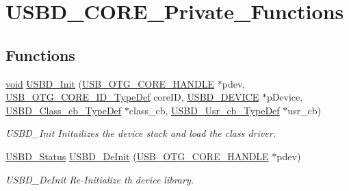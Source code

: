\hypertarget{group___u_s_b_d___c_o_r_e___private___functions}{\section{U\-S\-B\-D\-\_\-\-C\-O\-R\-E\-\_\-\-Private\-\_\-\-Functions}
\label{group___u_s_b_d___c_o_r_e___private___functions}
}
\subsection*{Functions}
\begin{DoxyCompactItemize}
\item 
\hyperlink{group___n_a_m_e_ga18028b8badbf1ea7e704ccac3c488e82}{void} \hyperlink{group___u_s_b_d___c_o_r_e___private___functions_ga21b6cdd5d4262e72f0c7fed84ecef95c}{U\-S\-B\-D\-\_\-\-Init} (\hyperlink{group___u_s_b___c_o_r_e___exported___types_gaf76054c11eb8a3367907aad7ae700e80}{U\-S\-B\-\_\-\-O\-T\-G\-\_\-\-C\-O\-R\-E\-\_\-\-H\-A\-N\-D\-L\-E} $\ast$pdev, \hyperlink{group___u_s_b___d_e_f_i_n_e_s___exported___types_gab31b9dd0bc08bf6120424c20bda8eb7e}{U\-S\-B\-\_\-\-O\-T\-G\-\_\-\-C\-O\-R\-E\-\_\-\-I\-D\-\_\-\-Type\-Def} core\-I\-D, \hyperlink{group___u_s_b___c_o_r_e___exported___types_ga383d3d5bf4017c2d95af4e092892d946}{U\-S\-B\-D\-\_\-\-D\-E\-V\-I\-C\-E} $\ast$p\-Device, \hyperlink{group___u_s_b___c_o_r_e___exported___types_ga94642fd764d31c3fb97bb089dc94d539}{U\-S\-B\-D\-\_\-\-Class\-\_\-cb\-\_\-\-Type\-Def} $\ast$class\-\_\-cb, \hyperlink{group___u_s_b___c_o_r_e___exported___types_ga333d185c45dd40a75aac486dd49b7160}{U\-S\-B\-D\-\_\-\-Usr\-\_\-cb\-\_\-\-Type\-Def} $\ast$usr\-\_\-cb)
\begin{DoxyCompactList}\small\item\em U\-S\-B\-D\-\_\-\-Init Initailizes the device stack and load the class driver. \end{DoxyCompactList}\item 
\hyperlink{group___u_s_b_d___c_o_r_e___exported___defines_ga1c59ec10075b576176aa51c9ef4e9fc4}{U\-S\-B\-D\-\_\-\-Status} \hyperlink{group___u_s_b_d___c_o_r_e___private___functions_ga64e0f6ef918a3ffff2b1506ef0684095}{U\-S\-B\-D\-\_\-\-De\-Init} (\hyperlink{group___u_s_b___c_o_r_e___exported___types_gaf76054c11eb8a3367907aad7ae700e80}{U\-S\-B\-\_\-\-O\-T\-G\-\_\-\-C\-O\-R\-E\-\_\-\-H\-A\-N\-D\-L\-E} $\ast$pdev)
\begin{DoxyCompactList}\small\item\em U\-S\-B\-D\-\_\-\-De\-Init Re-\/\-Initialize th device library. \end{DoxyCompactList}\item 

\end{DoxyCompactItemize}

